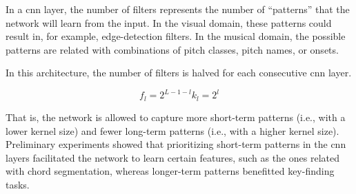 
In a \gls{cnn} layer, the number of filters represents the
number of ``patterns'' that the network will learn from the
input. In the visual domain, these patterns could result in,
for example, edge-detection filters. In the musical domain,
the possible patterns are related with combinations of pitch
classes, pitch names, or onsets.

In this architecture, the number of filters is halved for
each consecutive \gls{cnn} layer. 

\begin{equation}
    \label{eq:filters_kernel}
    f_l = 2^{L - 1 - l}
    k_l = 2^{l}
\end{equation}

That is, the network is allowed to capture more short-term
patterns (i.e., with a lower kernel size) and fewer
long-term patterns (i.e., with a higher kernel size).
Preliminary experiments showed that prioritizing short-term
patterns in the \gls{cnn} layers facilitated the network to
learn certain features, such as the ones related with chord
segmentation, whereas longer-term patterns benefitted
key-finding tasks.
